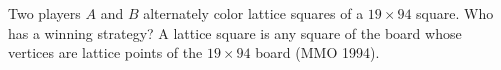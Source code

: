 Two players $A$ and $B$ alternately color lattice squares of a $19 \times 94$ square. Who has a winning strategy? A lattice square is any square of the board whose vertices are lattice points of the $19 \times 94$ board (MMO 1994).
